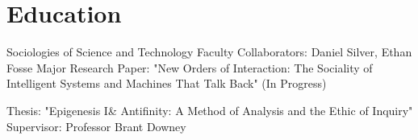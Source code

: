 \section{Education}

    Sociologies of Science and Technology
    Faculty Collaborators: Daniel Silver, Ethan Fosse
    Major Research Paper: "New Orders of Interaction: The Sociality of Intelligent Systems and Machines That Talk Back" (In Progress)

    Thesis: "Epigenesis I\& Antifinity: A Method of Analysis and the Ethic of Inquiry"
    Supervisor: Professor Brant Downey

